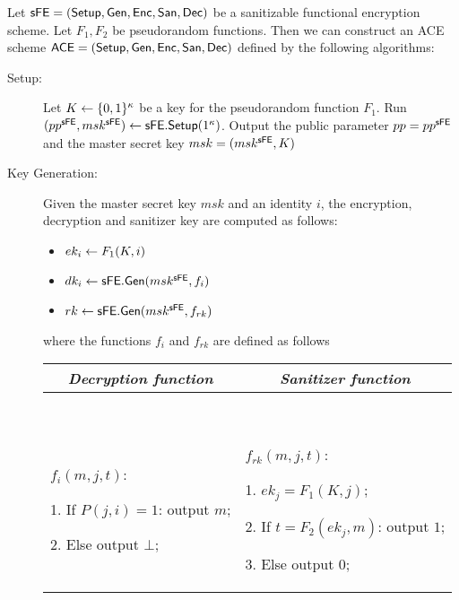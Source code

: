 \documentclass{llncs}
\begin{document}
\begin{construction} \label{con:ACEfromFE}
Let $\mathsf{sFE} = (\mathsf{Setup}, \mathsf{Gen}, \mathsf{Enc}, \mathsf{San}, \mathsf{Dec})$ be a sanitizable functional encryption scheme. Let $F_1,F_2$ be pseudorandom functions.
Then we can construct an ACE scheme $\mathsf{ACE} = (\mathsf{Setup}, \mathsf{Gen}, \mathsf{Enc}, \mathsf{San}, \mathsf{Dec})$ defined by the following algorithms:
\end{construction}
\begin{description}
\item[Setup:]
Let $K \leftarrow \{0,1\}^\kappa$ be a key for the pseudorandom function $F_1$. Run $(pp^{\mathsf{sFE}},msk^{\mathsf{sFE}}) \leftarrow \mathsf{sFE}.\mathsf{Setup}(1^\kappa)$. 
Output the public parameter $pp = pp^{\mathsf{sFE}}$ and the master secret key $msk = (msk^{\mathsf{sFE}},K)$


\item[Key Generation:]
Given the master secret key $msk$ and an identity $i$, the encryption, decryption and sanitizer key are computed as follows:
\begin{itemize}
\item $ek_i \leftarrow F_1(K,i)$
\item $dk_i \leftarrow \mathsf{sFE}.\mathsf{Gen}(msk^{\mathsf{sFE}}, f_i)$
\item $rk \leftarrow \mathsf{sFE}.\mathsf{Gen}(msk^{\mathsf{sFE}}, f_{rk})$
\end{itemize}
where the functions $f_i$ and $f_{rk}$ are defined as follows

\begin{center}
\begin{small}
    \begin{tabular}{| p{5.5cm} | p{5cm} |}
\hline
	\multicolumn{1}{|c|}{\textbf{\emph{Decryption function}}} & \multicolumn{1}{|c|}{\textbf{\emph{Sanitizer function}}}  \\
	\hline
	\
	
	$f_i(m,j,t)$:

	1. If $P(j,i) = 1$: output $m$;

	2. Else output $\bot$;

	&
	\

	$f_{rk}(m,j,t)$: 
	
	1. $ek_j = F_{1}(K,j)$;
	
	2. If $t = F_{2}(ek_j,m)$: output $1$;
	
	3. Else output $0$;

	\\
	\hline
	\end{tabular}
\end{small}
\end{center}



\end{description}
\end{document}
